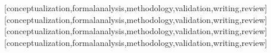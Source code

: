 \documentclass[english]{textolivre}
\begin{document}
\printbibliography\label{sec-bib}


\begin{contributors}
[conceptualization,formalanalysis,methodology,validation,writing,review]
[conceptualization,formalanalysis,methodology,validation,writing,review]
[conceptualization,formalanalysis,methodology,validation,writing,review]
[conceptualization,formalanalysis,methodology,validation,writing,review]
\end{contributors}
\end{document}
